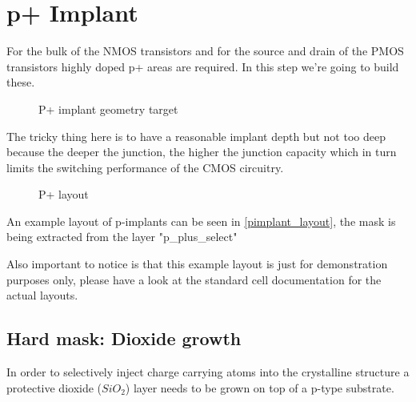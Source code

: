 \section{p+ Implant}\label{pimplant}
For the bulk of the NMOS transistors and for the source and drain of the PMOS transistors highly doped  p+ areas are required.
In this step we're going to build these.

\begin{figure}[H]
	\centering
	\begin{tikzpicture}[node distance = 3cm, auto, thick,scale=\CrossAndTopSectionBig, every node/.style={transform shape}]
		
	\end{tikzpicture}
	\begin{tikzpicture}[node distance = 3cm, auto, thick,scale=\CrossAndTopSectionBig, every node/.style={transform shape}]
		
	\end{tikzpicture}
	\caption{P+ implant geometry target}
\end{figure}

The tricky thing here is to have a reasonable implant depth but not too deep because the deeper the junction, the higher the junction capacity which in turn limits the switching performance of the CMOS circuitry.

\begin{figure}[H]
	\centering
	\begin{tikzpicture}[node distance =1cm, auto, thick,scale=\VLSILayout, every node/.style={transform shape}]
		
	\end{tikzpicture}
	\caption{P+ layout}
	\label{pimplant_layout}
\end{figure}

An example layout of p-implants can be seen in \autoref{pimplant_layout}, the mask is being extracted from the layer "p\_plus\_select"

Also important to notice is that this example layout is just for demonstration purposes only, please have a look at the standard cell documentation for the actual layouts. 

\newpage

\subsection{Hard mask: Dioxide growth}

In order to selectively inject charge carrying atoms into the crystalline structure a protective dioxide ($SiO_2$) layer needs to be grown on top of a p-type substrate.

